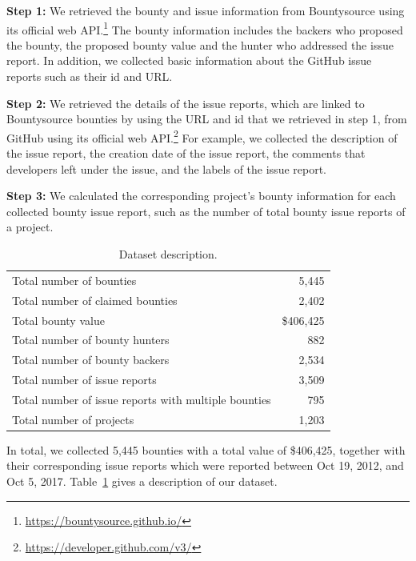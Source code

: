 \noindent\textbf{Step 1:} We retrieved the bounty and issue information from Bountysource using its official web API.\footnote{\url{https://bountysource.github.io/}} The bounty information includes the backers who proposed the bounty,  the proposed bounty value and the hunter who addressed the issue report. In addition, we collected basic information about the GitHub issue reports such as their id and URL.

\noindent\textbf{Step 2:} We retrieved the details of the issue reports, which are linked to Bountysource bounties by using the URL and id that we retrieved in step 1, from GitHub using its official web API.\footnote{\url{https://developer.github.com/v3/}} For example, we collected the description of the issue report, the creation date of the issue report, the comments that developers left under the issue, and the labels of the issue report.

\noindent\textbf{Step 3:} We calculated the corresponding project's bounty information for each collected bounty issue report, such as the number of total bounty issue reports of a project.



 \begin{table}[t]
   \centering
   \caption{Dataset description.}
     \begin{tabular}{p{24em}r}
    \hline
     Total number of bounties & 5,445 \bigstrut[t]\\
     Total number of claimed bounties & 2,402 \\
     Total bounty value & \$406,425 \\
     Total number of bounty hunters & 882 \\
     Total number of bounty backers & 2,534 \\
     Total number of issue reports & 3,509\\
     Total number of issue reports with multiple bounties & 795\\
     Total number of projects &  1,203 \bigstrut[b]\\
     \hline
     \end{tabular}%
   \label{tab:overviewOfGithub}%
   \vspace{-0.1in}

 \end{table}%


In total, we collected 5,445 bounties with a total value of \$406,425, together with their corresponding issue reports which were reported between Oct 19, 2012, and Oct 5, 2017. Table~\ref{tab:overviewOfGithub} gives a description of our dataset.


